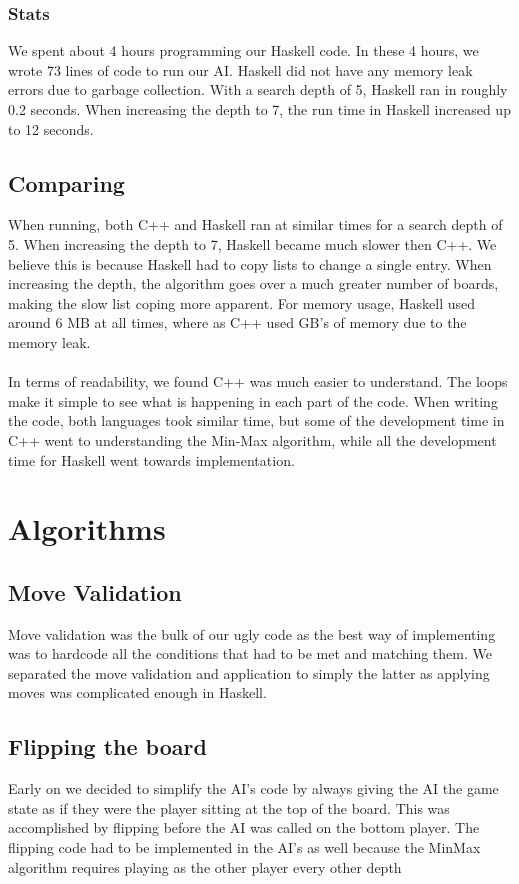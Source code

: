 \documentclass[12pt]{article}
\begin{document}
        \subsubsection{Stats}
            We spent about 4 hours programming our Haskell code. In these 4 hours, we wrote 73 lines of code to run our AI. Haskell did not have any memory leak errors due to garbage collection. With a search depth of 5, Haskell ran in roughly 0.2 seconds. When increasing the depth to 7, the run time in Haskell increased up to 12 seconds.

    \subsection{Comparing}
        When running, both C++ and Haskell ran at similar times for a search depth of 5. When increasing the depth to 7, Haskell became much slower then C++. We believe this is because Haskell had to copy lists to change a single entry. When increasing the depth, the algorithm goes over a much greater number of boards, making the slow list coping more apparent. For memory usage, Haskell used around 6 MB at all times, where as C++ used GB's of memory due to the memory leak. \\ \\
        In terms of readability, we found C++ was much easier to understand. The loops make it simple to see what is happening in each part of the code. When writing the code, both languages took similar time, but some of the development time in C++ went to understanding the Min-Max algorithm, while all the development time for Haskell went towards implementation.



\section{Algorithms}
		
	\subsection{Move Validation}
    	Move validation was the bulk of our ugly code as the best way of implementing was to hardcode all the conditions that had to be met and matching them. We separated the move validation and application to simply the latter as applying moves was complicated enough in Haskell.
	
	\subsection{Flipping the board}
        Early on we decided to simplify the AI's code by always giving the AI the game state as if they were the player sitting at the top of the board. This was accomplished by flipping before the AI was called on the bottom player.		The flipping code had to be implemented in the AI's as well because the MinMax algorithm requires playing as the other player every other depth
	
\end{document}
